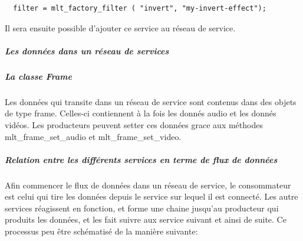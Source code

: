 \begin{lstlisting}
  filter = mlt_factory_filter ( "invert", "my-invert-effect");
\end{lstlisting}

Il sera ensuite possible d'ajouter ce service au réseau de service.

\subparagraph{Les données dans un réseau de services}

\subparagraph{La classe Frame}

\subparagraph{}

Les données qui transite dans un réseau de service sont contenus dans
des objets de type frame. Celles-ci contiennent à la fois les donnés
audio et les donnés vidéos. Les producteurs peuvent setter ces données
grace aux méthodes mlt\_frame\_set\_audio et mlt\_frame\_set\_video.

\subparagraph{Relation entre les différents services en terme de flux
de données}

Afin commencer le flux de données dans un réseau de service, le
consommateur est celui qui tire les données depuis le service sur
lequel il est connecté.  Les autre services réagissent en fonction,
et forme une chaine jusqu'au producteur qui produits les données, et
les fait suivre aux service suivant et ainsi de suite. Ce processus peu
être schématisé de la manière suivante:

